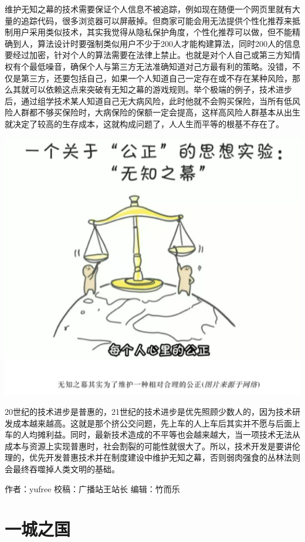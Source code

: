 \documentclass[]{book}
\begin{document}
维护无知之幕的技术需要保证个人信息不被追踪，例如现在随便一个网页里就有大量的追踪代码，很多浏览器可以屏蔽掉。但商家可能会用无法提供个性化推荐来抵制用户采用类似技术，其实我觉得从隐私保护角度，个性化推荐可以做，但不能精确到人，算法设计时要强制类似用户不少于200人才能构建算法，同时200人的信息要经过加密，针对个人的算法需要在法律上禁止。也就是对个人自己或第三方知情权有个最低噪音，确保个人与第三方无法准确知道对己方最有利的策略。没错，不仅是第三方，还要包括自己，如果一个人知道自己一定存在或不存在某种风险，那么其就可以依赖这点来突破有无知之幕的游戏规则。举个极端的例子，技术进步后，通过组学技术某人知道自己无大病风险，此时他就不会购买保险，当所有低风险人群都不够买保险时，大病保险的保额一定会提高，这样高风险人群基本从出生就决定了较高的生存成本，这就构成问题了，人人生而平等的根基不存在了。　

\includegraphics[width=6.67in]{images/wuzhi4}

20世纪的技术进步是普惠的，21世纪的技术进步是优先照顾少数人的，因为技术研发成本越来越高。这就是那个挤公交问题，先上车的人上车后其实并不愿与后面上车的人均摊利益。同时，最新技术造成的不平等也会越来越大，当一项技术无法从成本与资源上实现普惠时，社会割裂的可能性就很大了。所以，技术开发是要讲伦理的，优先开发普惠技术并在制度建设中维护无知之幕，否则弱肉强食的丛林法则会最终吞噬掉人类文明的基础。

作者：yufree
校稿：广播站王站长
编辑：竹而乐

\hypertarget{ux4e00ux57ceux4e4bux56fd}{%
\section{一城之国}\label{ux4e00ux57ceux4e4bux56fd}}
\end{document}
